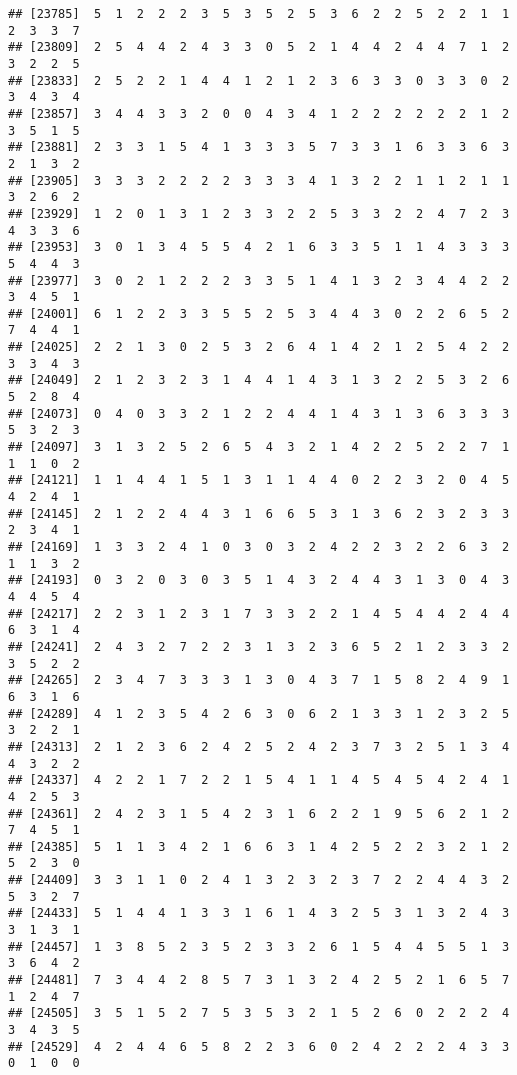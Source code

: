 \documentclass[
]{article}
\begin{document}
\begin{verbatim}
## [23785]  5  1  2  2  2  3  5  3  5  2  5  3  6  2  2  5  2  2  1  1  2  3  3  7
## [23809]  2  5  4  4  2  4  3  3  0  5  2  1  4  4  2  4  4  7  1  2  3  2  2  5
## [23833]  2  5  2  2  1  4  4  1  2  1  2  3  6  3  3  0  3  3  0  2  3  4  3  4
## [23857]  3  4  4  3  3  2  0  0  4  3  4  1  2  2  2  2  2  2  1  2  3  5  1  5
## [23881]  2  3  3  1  5  4  1  3  3  3  5  7  3  3  1  6  3  3  6  3  2  1  3  2
## [23905]  3  3  3  2  2  2  2  3  3  3  4  1  3  2  2  1  1  2  1  1  3  2  6  2
## [23929]  1  2  0  1  3  1  2  3  3  2  2  5  3  3  2  2  4  7  2  3  4  3  3  6
## [23953]  3  0  1  3  4  5  5  4  2  1  6  3  3  5  1  1  4  3  3  3  5  4  4  3
## [23977]  3  0  2  1  2  2  2  3  3  5  1  4  1  3  2  3  4  4  2  2  3  4  5  1
## [24001]  6  1  2  2  3  3  5  5  2  5  3  4  4  3  0  2  2  6  5  2  7  4  4  1
## [24025]  2  2  1  3  0  2  5  3  2  6  4  1  4  2  1  2  5  4  2  2  3  3  4  3
## [24049]  2  1  2  3  2  3  1  4  4  1  4  3  1  3  2  2  5  3  2  6  5  2  8  4
## [24073]  0  4  0  3  3  2  1  2  2  4  4  1  4  3  1  3  6  3  3  3  5  3  2  3
## [24097]  3  1  3  2  5  2  6  5  4  3  2  1  4  2  2  5  2  2  7  1  1  1  0  2
## [24121]  1  1  4  4  1  5  1  3  1  1  4  4  0  2  2  3  2  0  4  5  4  2  4  1
## [24145]  2  1  2  2  4  4  3  1  6  6  5  3  1  3  6  2  3  2  3  3  2  3  4  1
## [24169]  1  3  3  2  4  1  0  3  0  3  2  4  2  2  3  2  2  6  3  2  1  1  3  2
## [24193]  0  3  2  0  3  0  3  5  1  4  3  2  4  4  3  1  3  0  4  3  4  4  5  4
## [24217]  2  2  3  1  2  3  1  7  3  3  2  2  1  4  5  4  4  2  4  4  6  3  1  4
## [24241]  2  4  3  2  7  2  2  3  1  3  2  3  6  5  2  1  2  3  3  2  3  5  2  2
## [24265]  2  3  4  7  3  3  3  1  3  0  4  3  7  1  5  8  2  4  9  1  6  3  1  6
## [24289]  4  1  2  3  5  4  2  6  3  0  6  2  1  3  3  1  2  3  2  5  3  2  2  1
## [24313]  2  1  2  3  6  2  4  2  5  2  4  2  3  7  3  2  5  1  3  4  4  3  2  2
## [24337]  4  2  2  1  7  2  2  1  5  4  1  1  4  5  4  5  4  2  4  1  4  2  5  3
## [24361]  2  4  2  3  1  5  4  2  3  1  6  2  2  1  9  5  6  2  1  2  7  4  5  1
## [24385]  5  1  1  3  4  2  1  6  6  3  1  4  2  5  2  2  3  2  1  2  5  2  3  0
## [24409]  3  3  1  1  0  2  4  1  3  2  3  2  3  7  2  2  4  4  3  2  5  3  2  7
## [24433]  5  1  4  4  1  3  3  1  6  1  4  3  2  5  3  1  3  2  4  3  3  1  3  1
## [24457]  1  3  8  5  2  3  5  2  3  3  2  6  1  5  4  4  5  5  1  3  3  6  4  2
## [24481]  7  3  4  4  2  8  5  7  3  1  3  2  4  2  5  2  1  6  5  7  1  2  4  7
## [24505]  3  5  1  5  2  7  5  3  5  3  2  1  5  2  6  0  2  2  2  4  3  4  3  5
## [24529]  4  2  4  4  6  5  8  2  2  3  6  0  2  4  2  2  2  4  3  3  0  1  0  0

\end{verbatim}
\end{document}
